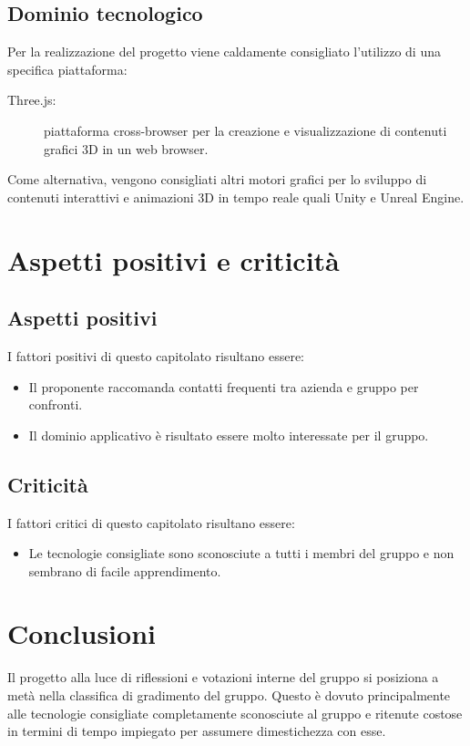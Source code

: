 \documentclass[12pt]{report}
\begin{document}
\subsection{Dominio tecnologico}
Per la realizzazione del progetto viene caldamente consigliato l'utilizzo di una specifica piattaforma:
\begin{description}
    \item[Three.js:] piattaforma cross-browser per la creazione e visualizzazione di contenuti grafici 3D in un web browser.
\end{description} 
Come alternativa, vengono consigliati altri motori grafici per lo sviluppo di contenuti interattivi e animazioni 3D in tempo reale quali Unity e Unreal Engine.
\section{Aspetti positivi e criticità}
\subsection{Aspetti positivi}
I fattori positivi di questo capitolato risultano essere:
\begin{itemize}
  \item Il proponente raccomanda contatti frequenti tra azienda e gruppo per confronti.
  \item Il dominio applicativo è risultato essere molto interessate per il gruppo.
\end{itemize}

\subsection{Criticità}
I fattori critici di questo capitolato risultano essere:
\begin{itemize}
  \item Le tecnologie consigliate sono sconosciute a tutti i membri del gruppo e non sembrano di facile apprendimento.
\end{itemize}

\section{Conclusioni}
Il progetto alla luce di riflessioni e votazioni interne del gruppo si posiziona a metà nella classifica di gradimento del gruppo. Questo è dovuto principalmente alle tecnologie consigliate completamente sconosciute al gruppo e ritenute costose in termini di tempo impiegato per assumere dimestichezza con esse.
\end{document}
